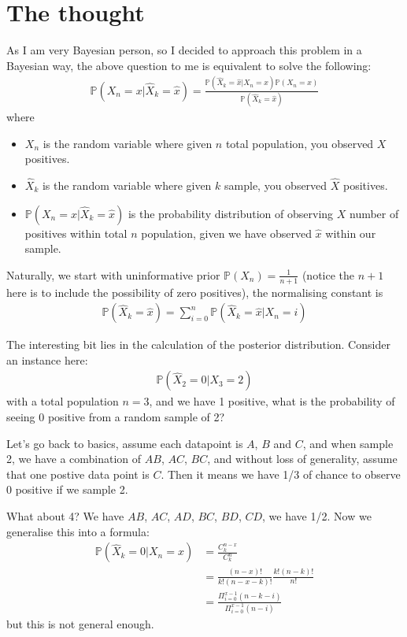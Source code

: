 \documentclass{article} [10pt] %
\begin{document}
\section{The thought}
As I am very Bayesian person, so I decided to approach this problem in a Bayesian way, the above question to me is equivalent to solve the following:
\begin{align}
	\mathbb{P}(X_n=x|\hat{X}_k=\hat{x}) = \frac{\mathbb{P}(\hat{X}_k=\hat{x}|X_n=x)\mathbb{P}(X_n=x)}{\mathbb{P}(\hat{X}_k=\hat{x})}
\end{align}
where
\begin{itemize}
	\item $X_n$ is the random variable where given $n$ total population, you observed $X$ positives.
	\item $\hat{X}_k$ is the random variable where given $k$ sample, you observed $\hat{X}$ positives.
	\item $\mathbb{P}(X_n=x|\hat{X}_k=\hat{x})$ is the probability distribution of observing $X$ number of positives within total $n$ population, given we have observed $\hat{x}$ within our sample.
\end{itemize}

Naturally, we start with uninformative prior $\mathbb{P}(X_n)= \frac{1}{n+1}$ (notice the $n+1$ here is to include the possibility of zero positives), the normalising constant is
\begin{align}
	\mathbb{P}(\hat{X}_k=\hat{x}) = \sum_{i=0}^n \mathbb{P}(\hat{X}_k=\hat{x}|X_n=i)
\end{align}

The interesting bit lies in the calculation of the posterior distribution. Consider an instance here:
\begin{align}
\mathbb{P}(\hat{X}_2=0|X_3=2)
\end{align}
with a total population $n=3$, and we have 1 positive, what is the probability of seeing 0 positive from a random sample of 2?

Let's go back to basics, assume each datapoint is $A$, $B$ and $C$, and when sample 2, we have a combination of $AB$, $AC$, $BC$, and without loss of generality, assume that one postive data point is $C$. Then it means we have 1/3 of chance to observe 0 positive if we sample 2.

What about 4? We have $AB$, $AC$, $AD$, $BC$, $BD$, $CD$, we have 1/2. Now we generalise this into a formula:
\begin{align}
\mathbb{P}(\hat{X}_k=0|X_n=x)& = \frac{C_k^{n-x}}{C_k^{n}}  \\
						& = \frac{(n-x)!}{k!(n-x-k)!}  \frac{k!(n-k)!}{n!} \\
						& = \frac{\Pi_{i=0}^{x-1}(n-k-i)}{\Pi_{i=0}^{x-1}(n-i)}
\end{align}
but this is not general enough.
\end{document}
